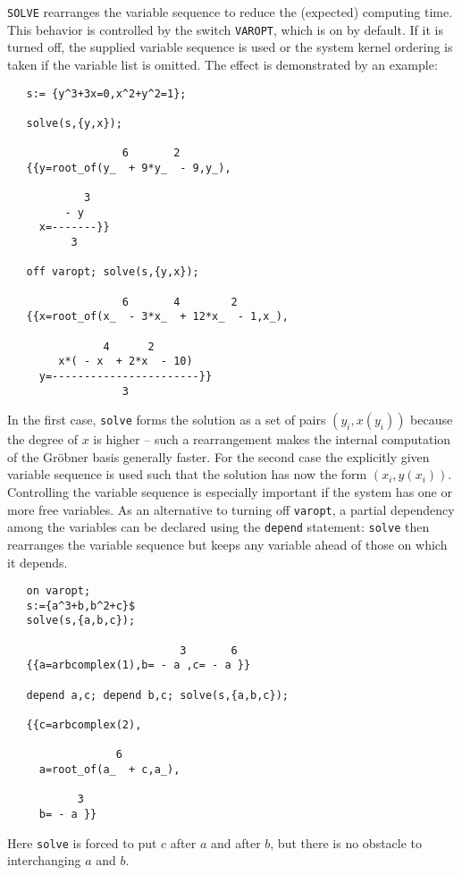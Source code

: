 \hypertarget{switch:VAROPT}{}
{\tt SOLVE} rearranges the variable sequence
to reduce the (expected) computing time. This behavior is controlled
by the switch {\tt VAROPT}, which is on by default.
If it is turned off, the supplied variable sequence is used
or the system kernel ordering is taken if the variable
list is omitted. The effect is demonstrated by an example:
\begin{verbatim}
   s:= {y^3+3x=0,x^2+y^2=1};

   solve(s,{y,x});

                  6       2
   {{y=root_of(y_  + 9*y_  - 9,y_),

            3
         - y
     x=-------}}
          3
 
   off varopt; solve(s,{y,x});

                  6       4        2
   {{x=root_of(x_  - 3*x_  + 12*x_  - 1,x_),

               4      2
        x*( - x  + 2*x  - 10)
     y=-----------------------}}
                  3

\end{verbatim}
In the first case, {\tt solve} forms the solution as a set of
pairs $(y_i,x(y_i))$ because the degree of $x$ is higher -- 
such a rearrangement makes the internal computation of the Gr\"obner basis
generally faster. For the second case the explicitly given variable sequence
is used such that the solution has now the form $(x_i,y(x_i))$.
Controlling the variable sequence is especially important if
the system has one or more free variables.
As an alternative to turning off {\tt varopt}, a partial dependency among
the variables can be declared using the {\tt depend}
statement: {\tt solve} then rearranges the variable sequence but keeps any
variable ahead of those on which it depends.
\extendedmanual{\newpage}
\begin{verbatim}
   on varopt;
   s:={a^3+b,b^2+c}$
   solve(s,{a,b,c});

                           3       6
   {{a=arbcomplex(1),b= - a ,c= - a }}

   depend a,c; depend b,c; solve(s,{a,b,c});

   {{c=arbcomplex(2),

                 6
     a=root_of(a_  + c,a_),

           3
     b= - a }}
\end{verbatim}
Here {\tt solve} is forced to put $c$ after $a$ and after $b$, but
there is no obstacle to interchanging $a$ and $b$.

